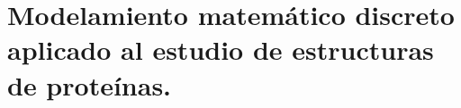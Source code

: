 \chapter{Modelamiento matemático discreto aplicado al estudio de estructuras de proteínas.}

\ifpdf
    \graphicspath{{Chapter5/Figs/Raster/}{Chapter5/Figs/PDF/}{Chapter5/Figs/}}
\else
    \graphicspath{{Chapter5/Figs/Vector/}{Chapter5/Figs/}}
\fi
